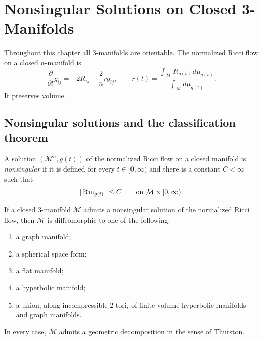 \chapter[32]{Nonsingular Solutions on Closed 3-Manifolds}
\label{ch:chow-iv-nonsingular-solutions-closed-three-manifolds}

Throughout this chapter all $3$-manifolds are orientable.  The normalized
Ricci flow on a closed $n$-manifold is
\begin{equation*}
 \frac{\partial}{\partial t}g_{ij}
 =-2R_{ij}+\frac{2}{n}r g_{ij},
 \qquad
 r(t)=\frac{\int_{\mathcal M}R_{g(t)}\,d\mu_{g(t)}}
 {\int_{\mathcal M}d\mu_{g(t)}}.
 \tag{32.1}
\end{equation*}
It preserves volume.

\section{Nonsingular solutions and the classification theorem}

\begin{definition}
\label{def:chow-iv-nonsingular-solution}

A solution $(\mathcal M^n,g(t))$ of the normalized Ricci flow on a closed
manifold is \emph{nonsingular} if it is defined for every
$t\in[0,\infty)$ and there is a constant $C<\infty$ such that
\[
 |\operatorname{Rm}_{g(t)}|\le C
 \qquad\text{on }\mathcal M\times[0,\infty).
\]
\end{definition}

\begin{theorem}
\label{thm:chow-iv-nonsingular-geometric-decomposition}


If a closed $3$-manifold $\mathcal M$ admits a nonsingular solution of the
normalized Ricci flow, then $\mathcal M$ is diffeomorphic to one of the
following:
\begin{enumerate}
\item a graph manifold;
\item a spherical space form;
\item a flat manifold;
\item a hyperbolic manifold;
\item a union, along incompressible $2$-tori, of finite-volume hyperbolic
manifolds and graph manifolds.
\end{enumerate}
In every case, $\mathcal M$ admits a geometric decomposition in the sense of
Thurston.
\end{theorem}

